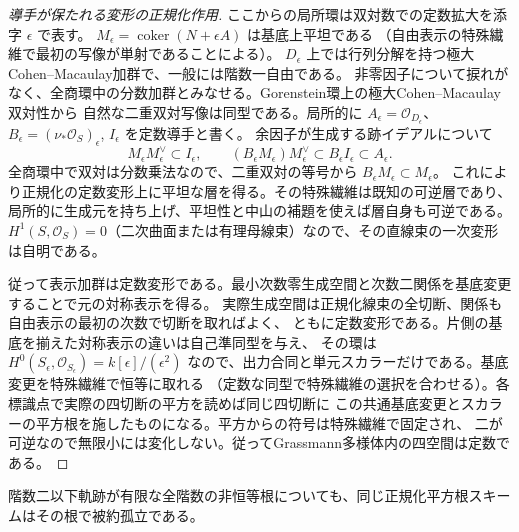 \begin{proof}[導手が保たれる変形の正規化作用]
ここからの局所環は双対数での定数拡大を添字 $\epsilon$ で表す。
$M_\epsilon=\operatorname{coker}(N+\epsilon A)$ は基底上平坦である
（自由表示の特殊繊維で最初の写像が単射であることによる）。
$D_\epsilon$ 上では行列分解を持つ極大Cohen--Macaulay加群で、一般には階数一自由である。
非零因子について捩れがなく、全商環中の分数加群とみなせる。Gorenstein環上の極大Cohen--Macaulay双対性から
自然な二重双対写像は同型である。局所的に $A_\epsilon=\mathcal O_{D_\epsilon}$、
$B_\epsilon=(\nu_*\mathcal O_S)_\epsilon$, $I_\epsilon$ を定数導手と書く。
余因子が生成する跡イデアルについて
\[
        M_\epsilon M_\epsilon^\vee\subset I_\epsilon,\qquad
        (B_\epsilon M_\epsilon)M_\epsilon^\vee\subset B_\epsilon I_\epsilon
          \subset A_\epsilon .
\]
全商環中で双対は分数乗法なので、二重双対の等号から $B_\epsilon M_\epsilon\subset M_\epsilon$。
これにより正規化の定数変形上に平坦な層を得る。その特殊繊維は既知の可逆層であり、
局所的に生成元を持ち上げ、平坦性と中山の補題を使えば層自身も可逆である。
$H^1(S,\mathcal O_S)=0$（二次曲面または有理母線束）なので、その直線束の一次変形は自明である。

従って表示加群は定数変形である。最小次数零生成空間と次数二関係を基底変更することで元の対称表示を得る。
実際生成空間は正規化線束の全切断、関係も自由表示の最初の次数で切断を取ればよく、
ともに定数変形である。片側の基底を揃えた対称表示の違いは自己準同型を与え、
その環は $H^0(S_\epsilon,\mathcal O_{S_\epsilon})=k[\epsilon]/(\epsilon^2)$
なので、出力合同と単元スカラーだけである。基底変更を特殊繊維で恒等に取れる
（定数な同型で特殊繊維の選択を合わせる）。各標識点で実際の四切断の平方を読めば同じ四切断に
この共通基底変更とスカラーの平方根を施したものになる。平方からの符号は特殊繊維で固定され、
二が可逆なので無限小には変化しない。従ってGrassmann多様体内の四空間は定数である。
\end{proof}
\begin{proposition}\label{prop:finite-opposite-root-reduced}
階数二以下軌跡が有限な全階数の非恒等根についても、同じ正規化平方根スキームはその根で被約孤立である。
\end{proposition}
